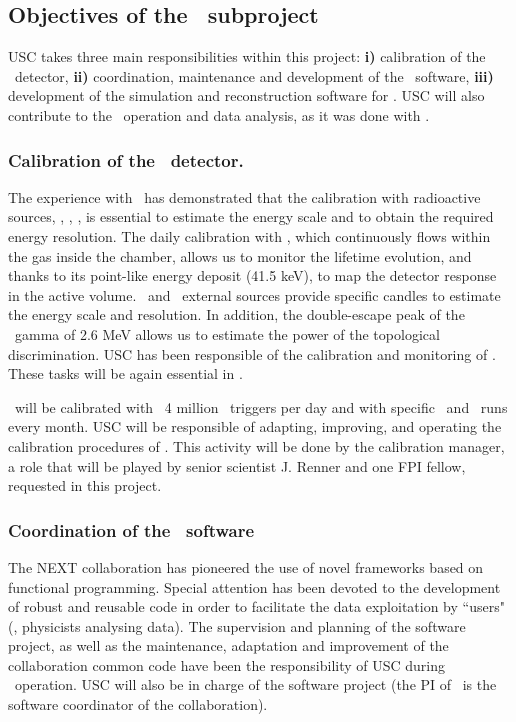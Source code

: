 \subsection{Objectives of the \sUSC\ subproject}
\label{sec.obj.usc}

\indent


USC takes three main responsibilities within this project: {\bf i)} calibration of the \Next\ detector, {\bf ii)} coordination, maintenance and development of the \Next\ software, {\bf iii)} development of the simulation and reconstruction software for \HDEMO. USC will also contribute to the \Next\ operation and data analysis, as it was done with \NEW.

\subsubsection{Calibration of the \Next\ detector.}

The experience with \NEW\ has demonstrated that the calibration with radioactive sources, \KR, \CS, \TL, is essential to estimate the energy scale and to obtain the required energy resolution. The daily calibration with \KR, which continuously flows within the gas inside the chamber, allows us to monitor the lifetime evolution, and thanks to its point-like energy deposit (41.5 keV), to map the detector response in the active volume. \CS\ and \TL\ external sources  provide specific candles to estimate the energy scale and resolution. In addition, the double-escape peak of the \TL\ gamma of 2.6 MeV allows us to estimate the power of the topological discrimination. USC has been responsible of the calibration and monitoring of \NEW. These tasks will be again essential in \Next. 

\Next\ will be calibrated with ~4 million \KR\ triggers per day and with specific \CS\ and \TL\ runs every month. USC will be responsible of adapting, improving, and operating the calibration procedures of \Next. This activity will be done by the calibration manager, a role that will be played by senior scientist J. Renner and one FPI fellow, requested in this project. 

\subsubsection{Coordination of the \Next\ software}

The NEXT collaboration has pioneered the use of novel frameworks based on functional programming. Special attention has been devoted to the development of  robust and reusable code in order to facilitate the data exploitation by ``users" (\ie, physicists analysing data). The supervision and planning of the software project, as well as the maintenance, adaptation and improvement of the collaboration common code have been the responsibility of USC during \NEW\ operation. USC will also be in charge of the software project (the PI of \sUSC\ is the software coordinator of the collaboration).  

